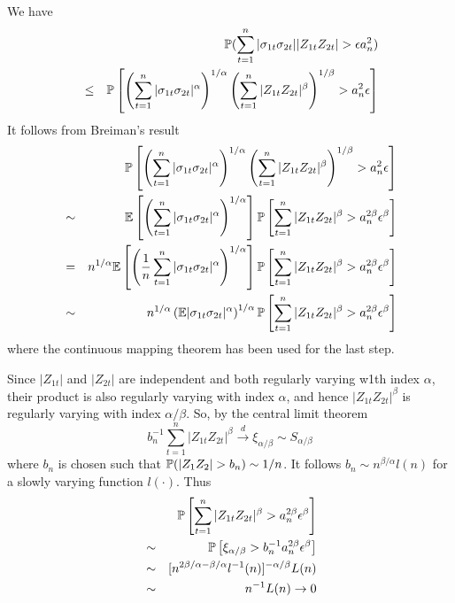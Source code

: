 \documentclass{article}
\begin{document}
We have
\begin{eqnarray*}
&& \P(\sum_{t=1}^n | \sigma_{1t}\sigma_{2t} ||Z_{1t} Z_{2t}| > \epsilon a_n^{2}) \\
&\leq& \P\left[
\left(\sum_{t=1}^n |
  \sigma_{1t}\sigma_{2t}|^{\alpha}\right)^{1/\alpha} \left(
  \sum_{t=1}^n |Z_{1t} Z_{2t}|^{\beta}\right)^{1/\beta} > a_n^{2}
\epsilon
\right]
\end{eqnarray*}
It follows from Breiman's result
\begin{eqnarray*}
&& \P\left[
\left(\sum_{t=1}^n |
  \sigma_{1t}\sigma_{2t}|^{\alpha}\right)^{1/\alpha} \left(
  \sum_{t=1}^n |Z_{1t} Z_{2t}|^{\beta}\right)^{1/\beta} > a_n^{2}
\epsilon \right] \\
&\sim& \E \left[ \left(\sum_{t=1}^n | \sigma_{1t}\sigma_{2t}|^{\alpha}\right)^{1/\alpha} \right]
\P \left[ \sum_{t=1}^n |Z_{1t} Z_{2t}|^{\beta} > a_n^{2\beta} \epsilon^{\beta} \right] \\
&=& n^{1/\alpha} \E \left[ \left({1 \over n}\sum_{t=1}^n |
    \sigma_{1t}\sigma_{2t}|^{\alpha}\right)^{1/\alpha} \right] \P\left[
  \sum_{t=1}^n |Z_{1t} Z_{2t}|^{\beta} > a_n^{2\beta}
  \epsilon^{\beta} \right] \\
&\sim& n^{1/\alpha} \left( \E | \sigma_{1t}\sigma_{2t}|^{\alpha} \right)^{1/\alpha}
\P \left[ \sum_{t=1}^n |Z_{1t} Z_{2t}|^{\beta} > a_n^{2\beta} \epsilon^{\beta} \right] \\
\end{eqnarray*}
where the continuous mapping theorem has been used for the last step.

Since $|Z_{1t}|$ and $|Z_{2t}|$ are independent and both regularly
varying w1th index $\alpha$, their product is also regularly varying
with index $\alpha$, and hence $|Z_{1t} Z_{2t}|^{\beta}$ is regularly
varying with index $\alpha/\beta$. So, by the central limit theorem
$$
b_n^{-1} \sum_{t=1}^n |Z_{1t} Z_{2t}|^{\beta} \overset{d}{\to} \xi_{\alpha/\beta} \sim S_{\alpha/\beta}
$$
where $b_n$ is chosen such that $\P(|Z_1 Z_2| > b_n) \sim 1/n$. It
follows $b_n \sim n^{\beta/\alpha} l(n)$ for a slowly varying function
$l(\cdot)$. Thus
\begin{eqnarray*}
&& \P \left[\sum_{t=1}^n |Z_{1t} Z_{2t}|^{\beta} > a_n^{2\beta} \epsilon^{\beta} \right] \\
&\sim& \P \left[ \xi_{\alpha/\beta} > b_n^{-1} a_n^{2\beta} \epsilon^{\beta} \right] \\
&\sim& [n^{2\beta/\alpha - \beta/\alpha} l^{-1}(n)]^{-\alpha/\beta}
L(n) \\
&\sim& n^{-1}L(n) \to 0
\end{eqnarray*}
\end{document}

